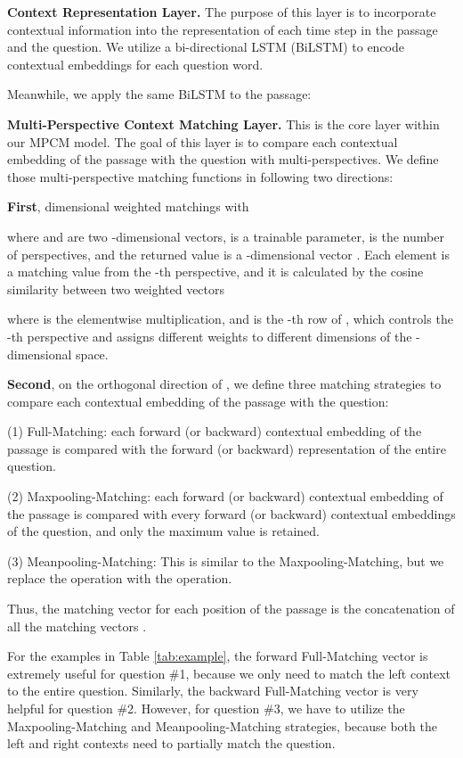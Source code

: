 \documentclass[11pt,letterpaper]{article}
\begin{document}
\textbf{Context Representation Layer.} The purpose of this layer is to incorporate contextual information into the representation of each time step in the passage and the question. We utilize a bi-directional LSTM (BiLSTM) to encode contextual embeddings for each question word.


Meanwhile, we apply the same BiLSTM to the passage:

 
\textbf{Multi-Perspective Context Matching Layer.} 
This is the core layer within our MPCM model. 
The goal of this layer is to compare each contextual embedding of the passage with the question with multi-perspectives.
We define those multi-perspective matching functions in following two directions:

\textbf{First}, dimensional weighted matchings with

where  and  are two -dimensional vectors,  is a trainable parameter,  is the number of perspectives, and the returned value  is a -dimensional vector . Each element  is a matching value from the -th perspective, and it is calculated by the cosine similarity between two weighted vectors

where  is the elementwise multiplication, and  is the -th row of , which controls the -th perspective and assigns different weights to different dimensions of the -dimensional space.

\textbf{Second}, on the orthogonal direction of , 
we define three matching strategies to compare each contextual embedding of the passage with the question:

(1) Full-Matching: each forward (or backward) contextual embedding of the passage is compared with the forward (or backward) representation of the entire question.

 

(2) Maxpooling-Matching: each forward (or backward) contextual embedding of the passage is compared with every forward (or backward) contextual embeddings of the question, and only the maximum value is retained.


 

(3) Meanpooling-Matching: This is similar to the Maxpooling-Matching, but we replace the  operation with the  operation.


Thus, the matching vector for each position of the passage is the concatenation of all the matching vectors 
. 

For the examples in Table \ref{tab:example}, the forward Full-Matching vector is extremely useful for question \#1, because we only need to match the left context to the entire question. Similarly, the backward Full-Matching vector is very helpful for question \#2. However, for question \#3, we have to utilize the Maxpooling-Matching and Meanpooling-Matching strategies, because both the left and right contexts need to partially match the question.
\end{document}
